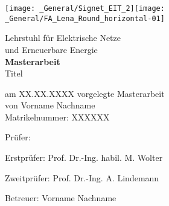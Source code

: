%
\begin{titlepage}
    \begin{center}
        \texttt{[image: \_General/Signet\_EIT\_2]}\hspace{0.5cm}\texttt{[image: \_General/FA\_Lena\_Round\_horizontal-01]}

        \vspace{1.5cm} %
        \huge
        Lehrstuhl für Elektrische Netze \\
        und Erneuerbare Energie \\
        \vspace{1.5cm} %
        \huge
        \textbf{Masterarbeit} \\
        \vspace{1.5cm} %
        \Large
        Titel  \\
        \vspace{1cm} %
    \end{center}    
    \normalsize
    \vfill %
    am XX.XX.XXXX vorgelegte Masterarbeit \\
    von Vorname Nachname \\
    Matrikelnummer: XXXXXX \\
    \begin{labeling}{Prüfer: }
        \item[Erstprüfer:]\tabto{1cm} Prof. Dr.-Ing. habil. M. Wolter
		\item[Zweitprüfer:]\tabto{1cm} Prof. Dr.-Ing. A. Lindemann
        \item
        \item[Betreuer:]\tabto{1cm} Vorname Nachname
    \end{labeling}
\end{titlepage}
